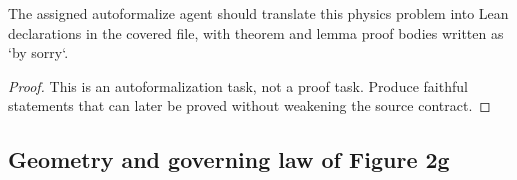 \begin{theorem}
\label{thm:physics:IPhO_2026_2_C_1:target}
The assigned autoformalize agent should translate this physics problem into Lean declarations in the covered file, with theorem and lemma proof bodies written as `by sorry`.
\end{theorem}
\begin{proof}
This is an autoformalization task, not a proof task. Produce faithful statements that can later be proved without weakening the source contract.
\end{proof}

\subsection*{Geometry and governing law of Figure 2g}

